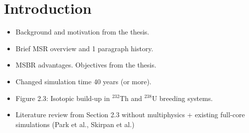 \section{Introduction}
\begin{itemize}
	\item Background and motivation from the thesis. 
	\item Brief \gls{MSR} overview and 1 paragraph history. 
	\item \gls{MSBR} advantages. Objectives from the thesis. 
	\item Changed simulation time 40 years (or more). 
	\item Figure 2.3: Isotopic build-up in $^{232}$Th and $^{238}$U breeding systems. 
	\item Literature review from Section 2.3 without multiphysics + existing full-core simulations (Park et al., Skirpan et al.)
\end{itemize}
